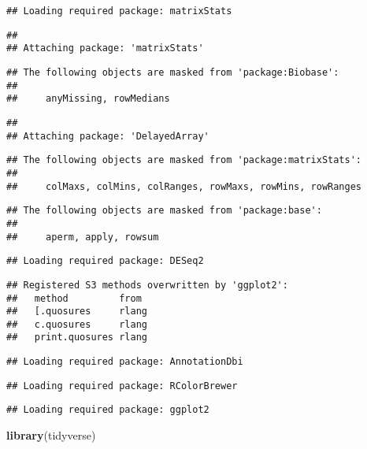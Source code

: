 \documentclass[]{article}
\newenvironment{Shaded}{\begin{snugshade}}{\end{snugshade}}
\newcommand{\KeywordTok}[1]{\textcolor[rgb]{0.13,0.29,0.53}{\textbf{#1}}}
\newcommand{\NormalTok}[1]{#1}
\begin{document}
\begin{verbatim}
## Loading required package: matrixStats
\end{verbatim}

\begin{verbatim}
## 
## Attaching package: 'matrixStats'
\end{verbatim}

\begin{verbatim}
## The following objects are masked from 'package:Biobase':
## 
##     anyMissing, rowMedians
\end{verbatim}

\begin{verbatim}
## 
## Attaching package: 'DelayedArray'
\end{verbatim}

\begin{verbatim}
## The following objects are masked from 'package:matrixStats':
## 
##     colMaxs, colMins, colRanges, rowMaxs, rowMins, rowRanges
\end{verbatim}

\begin{verbatim}
## The following objects are masked from 'package:base':
## 
##     aperm, apply, rowsum
\end{verbatim}

\begin{verbatim}
## Loading required package: DESeq2
\end{verbatim}

\begin{verbatim}
## Registered S3 methods overwritten by 'ggplot2':
##   method         from 
##   [.quosures     rlang
##   c.quosures     rlang
##   print.quosures rlang
\end{verbatim}

\begin{verbatim}
## Loading required package: AnnotationDbi
\end{verbatim}

\begin{verbatim}
## Loading required package: RColorBrewer
\end{verbatim}

\begin{verbatim}
## Loading required package: ggplot2
\end{verbatim}

\begin{Shaded}
\begin{Highlighting}[]
\KeywordTok{library}\NormalTok{(tidyverse)}
\end{Highlighting}
\end{Shaded}
\end{document}
